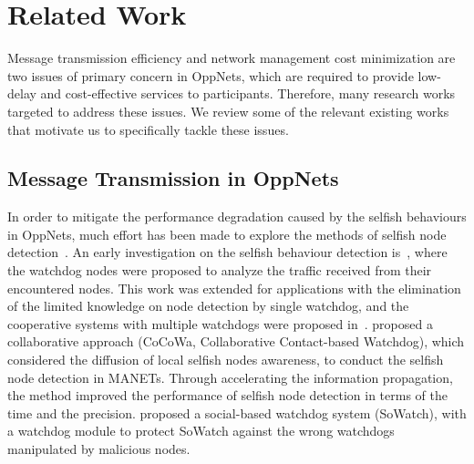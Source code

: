 \section{Related Work}
\label{sec:related}
Message transmission efficiency and
network management cost minimization
are two issues of primary concern in
OppNets, which are required to provide
low-delay and cost-effective services
to participants. Therefore, many research works
targeted to address these issues.
We review some of the relevant existing works
that motivate us to specifically tackle these issues.

\subsection{Message Transmission in OppNets}
In order to mitigate the performance degradation caused by
the selfish behaviours in OppNets,
much effort has been made to explore
the methods of selfish node
detection~\cite{DBLP:journals/tvt/LiSWJSZ11, DBLP:journals/comsur/JedariXN18}.
An early investigation on the selfish behaviour detection
is~\cite{DBLP:conf/mobicom/MartiGLB00},
where the watchdog nodes were proposed
to analyze the traffic received from their encountered nodes.
This work was extended for applications with
the elimination of the limited knowledge on node detection by single watchdog,
and the cooperative systems with multiple watchdogs were proposed
in~\cite{DBLP:journals/tmc/Hernandez-Orallo15, DBLP:journals/tie/DiasRXM15,
DBLP:journals/fgcs/JedariXCDTA19}.
\cite{DBLP:journals/tmc/Hernandez-Orallo15} proposed
a collaborative approach (CoCoWa, Collaborative Contact-based Watchdog),
which considered the diffusion of local selfish nodes awareness,
to conduct the selfish node detection in MANETs.
Through accelerating the information propagation,
the method improved the performance of selfish node detection
in terms of the time and the precision.
\cite{DBLP:journals/fgcs/JedariXCDTA19} proposed
a social-based watchdog system (SoWatch),
with a watchdog module to protect SoWatch
against the wrong watchdogs manipulated by malicious nodes.


